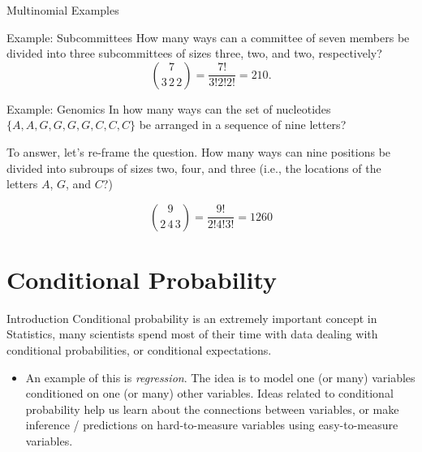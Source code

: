 \begin{frame}[allowframebreaks]{Multinomial Examples}
  \begin{exampleblock}{Example: Subcommittees}
    How many ways can a committee of seven members be divided into three subcommittees of sizes three, two, and two, respectively?
    $$
    \binom{7}{3\,2\,2} = \frac{7!}{3!2!2!} = 210.
    $$
  \end{exampleblock}
  
  \begin{exampleblock}{Example: Genomics}
    In how many ways can the set of nucleotides $\{A, A, G, G, G, G, C, C, C\}$ be arranged in a sequence of nine letters? 
    
    To answer, let's re-frame the question. How many ways can nine positions be divided into subroups of sizes two, four, and three (i.e., the locations of the letters $A$, $G$, and $C$?)
    
    $$
    \binom{9}{2\,4\,3} = \frac{9!}{2!4!3!} = 1260
    $$
  \end{exampleblock}
  
\end{frame}

\section{Conditional Probability}

\begin{frame}{Introduction}
  \alert{Conditional probability} is an extremely important concept in Statistics, many scientists spend most of their time with data dealing with conditional probabilities, or conditional expectations.
  
  \begin{itemize}
    \item An example of this is \emph{regression}.
  The idea is to model one (or many) variables conditioned on one (or many) other variables.
  Ideas related to conditional probability help us learn about the connections between variables, or make inference / predictions on hard-to-measure variables using easy-to-measure variables.
  \end{itemize}
  
\end{frame}

